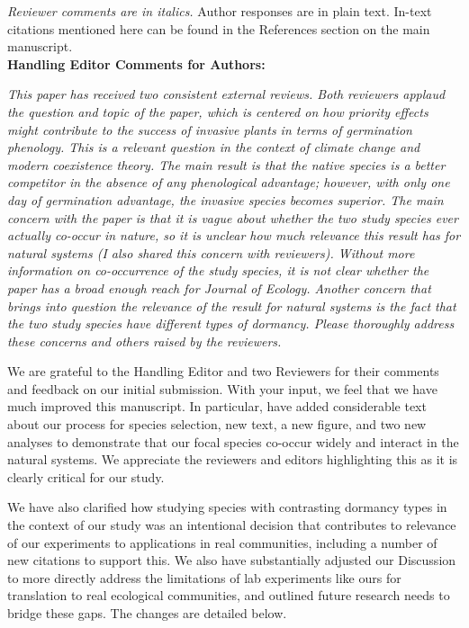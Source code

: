 \documentclass[11pt]{article}
\begin{document}
\emph{Reviewer comments are in italics.} Author responses are in plain text. In-text citations mentioned here can be found in the References section on the main manuscript.\\

\textbf{Handling Editor Comments for Authors:}

\emph{This paper has received two consistent external reviews. Both reviewers applaud the question and topic of the paper, which is centered on how priority effects might contribute to the success of invasive plants in terms of germination phenology. This is a relevant question in the context of climate change and modern coexistence theory. The main result is that the native species is a better competitor in the absence of any phenological advantage; however, with only one day of germination advantage, the invasive species becomes superior. The main concern with the paper is that it is vague about whether the two study species ever actually co-occur in nature, so it is unclear how much relevance this result has for natural systems (I also shared this concern with reviewers). Without more information on co-occurrence of the study species, it is not clear whether the paper has a broad enough reach for Journal of Ecology. Another concern that brings into question the relevance of the result for natural systems is the fact that the two study species have different types of dormancy. Please thoroughly address these concerns and others raised by the reviewers. }

We are grateful to the Handling Editor and two Reviewers for their comments and feedback on our initial submission. With your input, we feel that we have much improved this manuscript. In particular, have added considerable text about our process for species selection, new text, a new figure, and two new analyses to demonstrate that our focal species co-occur widely and interact in the natural systems. We appreciate the reviewers and editors highlighting this as it is clearly critical for our study. 

We have also clarified how studying species with contrasting dormancy types in the context of our study was an intentional decision that contributes to relevance of our experiments to applications in real communities, including a number of new citations to support this. We also have substantially adjusted our Discussion to more directly address the limitations of lab experiments like ours for translation to real ecological communities, and outlined future research needs to bridge these gaps. The changes are detailed below.
\end{document}
